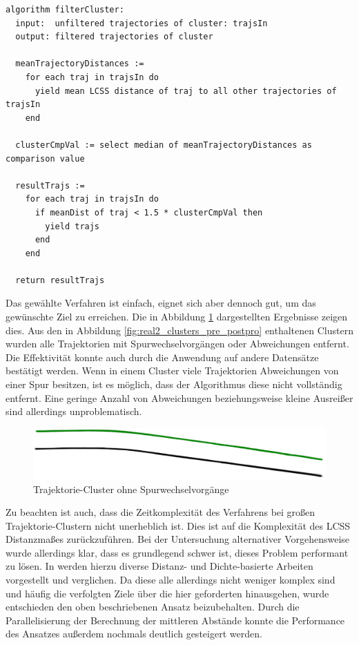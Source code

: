 \begin{lstlisting}[caption=Pseudocode Cluster Post-Processing, language=Pseudo, label=lst:pseudo_post_processing]
algorithm filterCluster:
  input:  unfiltered trajectories of cluster: trajsIn
  output: filtered trajectories of cluster

  meanTrajectoryDistances :=
    for each traj in trajsIn do
      yield mean LCSS distance of traj to all other trajectories of trajsIn
    end

  clusterCmpVal := select median of meanTrajectoryDistances as comparison value

  resultTrajs :=
    for each traj in trajsIn do
      if meanDist of traj < 1.5 * clusterCmpVal then
        yield trajs
      end
    end

  return resultTrajs
\end{lstlisting}

Das gewählte Verfahren ist einfach, eignet sich aber dennoch gut, um das gewünschte Ziel zu erreichen.
Die in Abbildung \ref{fig:real2_clusters_post_postpro} dargestellten Ergebnisse zeigen dies.
Aus den in Abbildung \ref{fig:real2_clusters_pre_postpro} enthaltenen Clustern wurden alle Trajektorien
mit Spurwechselvorgängen oder Abweichungen entfernt. Die Effektivität konnte auch durch die Anwendung
auf andere Datensätze bestätigt werden.
Wenn in einem Cluster viele Trajektorien Abweichungen von einer Spur besitzen, ist es möglich, dass der Algorithmus
diese nicht vollständig entfernt. Eine geringe Anzahl von Abweichungen beziehungsweise kleine Ausreißer
sind allerdings unproblematisch. 

\begin{figure}[H]
    \centering
    \includegraphics[width=0.8\linewidth]{../resources/img/umsetzung/U2/Clusters_Post_Postprocessing}
    \caption{Trajektorie-Cluster ohne Spurwechselvorgänge}
    \label{fig:real2_clusters_post_postpro}
\end{figure}

Zu beachten ist auch, dass die Zeitkomplexität des Verfahrens bei großen Trajektorie-Clustern
nicht unerheblich ist. Dies ist auf die Komplexität des LCSS Distanzmaßes zurückzuführen.
Bei der Untersuchung alternativer Vorgehensweise wurde allerdings klar, dass es grundlegend schwer ist,
dieses Problem performant zu lösen. In \cite[]{Meng2018} werden hierzu diverse Distanz- und Dichte-basierte
Arbeiten vorgestellt und verglichen. Da diese alle allerdings nicht weniger komplex sind und häufig
die verfolgten Ziele über die hier geforderten hinausgehen, wurde entschieden den oben beschriebenen Ansatz
beizubehalten. Durch die Parallelisierung der Berechnung der mittleren Abstände konnte die Performance
des Ansatzes außerdem nochmals deutlich gesteigert werden.

